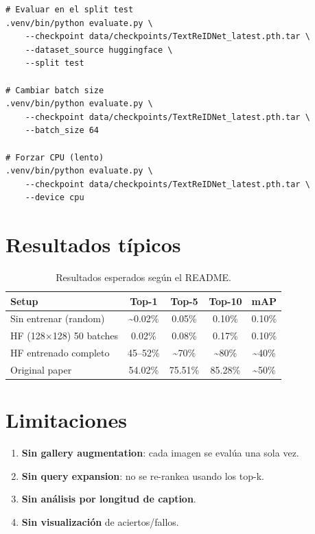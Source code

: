 \begin{verbatim}
# Evaluar en el split test
.venv/bin/python evaluate.py \
    --checkpoint data/checkpoints/TextReIDNet_latest.pth.tar \
    --dataset_source huggingface \
    --split test

# Cambiar batch size
.venv/bin/python evaluate.py \
    --checkpoint data/checkpoints/TextReIDNet_latest.pth.tar \
    --batch_size 64

# Forzar CPU (lento)
.venv/bin/python evaluate.py \
    --checkpoint data/checkpoints/TextReIDNet_latest.pth.tar \
    --device cpu
\end{verbatim}

\section{Resultados típicos}

\begin{table}[H]
\centering
\caption{Resultados esperados según el README.}
\label{tab:resultados-tipicos-eval}
\begin{tabular}{lcccc}
\toprule
\textbf{Setup} & \textbf{Top-1} & \textbf{Top-5} & \textbf{Top-10} & \textbf{mAP} \\
\midrule
Sin entrenar (random) & \textasciitilde 0.02\% & 0.05\% & 0.10\% & 0.10\% \\
HF (128×128) 50 batches & 0.02\% & 0.08\% & 0.17\% & 0.10\% \\
HF entrenado completo & 45--52\% & \textasciitilde 70\% & \textasciitilde 80\% & \textasciitilde 40\% \\
Original paper & 54.02\% & 75.51\% & 85.28\% & \textasciitilde 50\% \\
\bottomrule
\end{tabular}
\end{table}

\section{Limitaciones}

\begin{enumerate}
  \item \textbf{Sin gallery augmentation}: cada imagen se evalúa
        una sola vez.
  \item \textbf{Sin query expansion}: no se re-rankea usando
        los top-k.
  \item \textbf{Sin análisis por longitud de caption}.
  \item \textbf{Sin visualización} de aciertos/fallos.
\end{enumerate}
